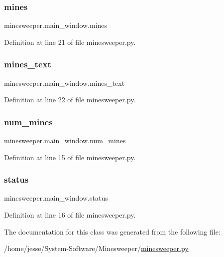 \subsubsection{\texorpdfstring{mines}{mines}}
{\footnotesize\ttfamily minesweeper.\+main\+\_\+window.\+mines}



Definition at line 21 of file minesweeper.\+py.

\mbox{\label{classminesweeper_1_1main__window_a8540aa4905d29c57ed6f06b5ea83d196}} 
\subsubsection{\texorpdfstring{mines\_text}{mines\_text}}
{\footnotesize\ttfamily minesweeper.\+main\+\_\+window.\+mines\+\_\+text}



Definition at line 22 of file minesweeper.\+py.

\mbox{\label{classminesweeper_1_1main__window_ae651ccbb38021540ec18b0a56a942ba4}} 
\subsubsection{\texorpdfstring{num\_mines}{num\_mines}}
{\footnotesize\ttfamily minesweeper.\+main\+\_\+window.\+num\+\_\+mines}



Definition at line 15 of file minesweeper.\+py.

\mbox{\label{classminesweeper_1_1main__window_a72c341956238afec0b65c3bcf150a5c5}} 
\subsubsection{\texorpdfstring{status}{status}}
{\footnotesize\ttfamily minesweeper.\+main\+\_\+window.\+status}



Definition at line 16 of file minesweeper.\+py.



The documentation for this class was generated from the following file\+:\begin{DoxyCompactItemize}
\item 
/home/jesse/\+System-\/\+Software/\+Minesweeper/\mbox{\hyperlink{minesweeper_8py}{minesweeper.\+py}}\end{DoxyCompactItemize}

